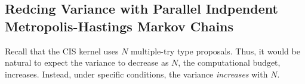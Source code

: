 


\subsection{Redcing Variance with Parallel Indpendent Metropolis-Hastings Markov Chains}\label{section:cis_bias}
Recall that the CIS kernel uses \(N\) multiple-try type proposals.
Thus, it would be natural to expect the variance to decrease as \(N\), the computational budget, increases.
Instead, under specific conditions, the variance \textit{increases} with \(N\).

